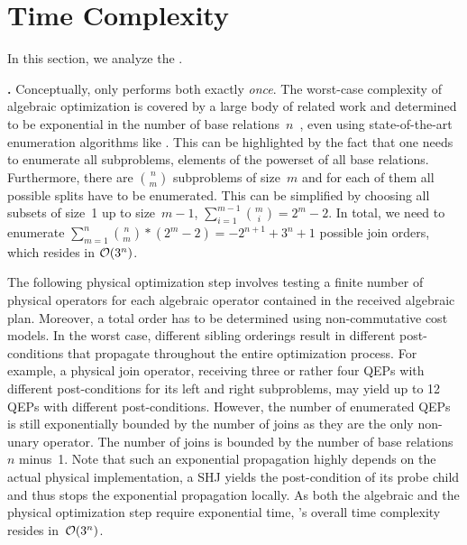 \section{Time Complexity}
\label{sec:time-complexity}

In this section, we analyze the .

\textbf{\split.}
Conceptually, \split only performs both  exactly \emph{once}.  The worst-case complexity of algebraic optimization is covered by a large body of related work and determined to be exponential in the number of base relations~$n$~\cite{complexity_join_enumeration, np_hardness_join_enumeration}, even using state-of-the-art enumeration algorithms like \DPccp.  This can be highlighted by the fact that one needs to enumerate all subproblems, \ie elements of the powerset of all base relations. Furthermore, there are $\binom{n}{m}$ subproblems of size~$m$ and for each of them all possible splits have to be enumerated.  This can be simplified by choosing all subsets of size~1 up to size~$m-1$, \ie $\sum_{i=1}^{m-1}\binom{m}{i} = 2^m-2$. In total, we need to enumerate $\sum_{m=1}^{n}\binom{n}{m}*(2^m-2) = -2^{n+1}+3^n+1$ possible join orders, which resides in $\mathcal{O}(3^n)$.

The following physical optimization step involves testing a finite number of physical operators for each algebraic operator contained in the received algebraic plan.  Moreover, a total order has to be determined using non-commutative cost models.  In the worst case, different sibling orderings result in different post-conditions that propagate throughout the entire optimization process.  For example, a physical join operator, receiving three or rather four QEPs with different post-conditions for its left and right subproblems, may yield up to 12 QEPs with different post-conditions.  However, the number of enumerated QEPs is still exponentially bounded by the number of joins as they are the only non-unary operator.  The number of joins is bounded by the number of base relations~$n$ minus~1.  Note that such an exponential propagation highly depends on the actual physical implementation, \eg a SHJ yields the post-condition of its probe child and thus stops the exponential propagation locally.  As both the algebraic and the physical optimization step require exponential time, \split's overall time complexity resides in~$\mathcal{O}(3^n)$.

